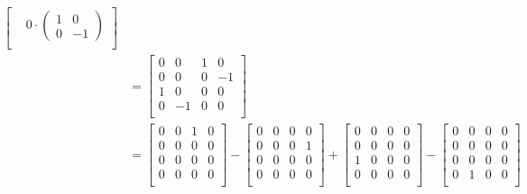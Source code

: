 \documentclass[11pt]{article}
\begin{document}
\begin{enumerate}
\begin{align*}
\begin{bmatrix}
                    &   0 \cdot \begin{pmatrix}1 & 0 \\ 0 & -1 \end{pmatrix}  \\
                    \end{bmatrix} \\
                    &= \begin{bmatrix}
                    0 & 0 & 1 & 0\\
                    0 & 0 & 0 & -1\\
                    1 & 0 & 0 & 0\\
                    0 & -1 & 0 & 0\\
                    \end{bmatrix} \\
                    &= 
                    \begin{bmatrix}
                    0 & 0 & 1 & 0\\
                    0 & 0 & 0 & 0\\
                    0 & 0 & 0 & 0\\
                    0 & 0 & 0 & 0\\
                    \end{bmatrix} -
                    \begin{bmatrix}
                    0 & 0 & 0 & 0\\
                    0 & 0 & 0 & 1\\
                    0 & 0 & 0 & 0\\
                    0 & 0 & 0 & 0\\
                    \end{bmatrix} +
                    \begin{bmatrix}
                    0 & 0 & 0 & 0\\
                    0 & 0 & 0 & 0\\
                    1 & 0 & 0 & 0\\
                    0 & 0 & 0 & 0\\
                    \end{bmatrix} -
                    \begin{bmatrix}
                    0 & 0 & 0 & 0\\
                    0 & 0 & 0 & 0\\
                    0 & 0 & 0 & 0\\
                    0 & 1 & 0 & 0\\

\end{bmatrix}
\end{align*}
\end{enumerate}
\end{document}
